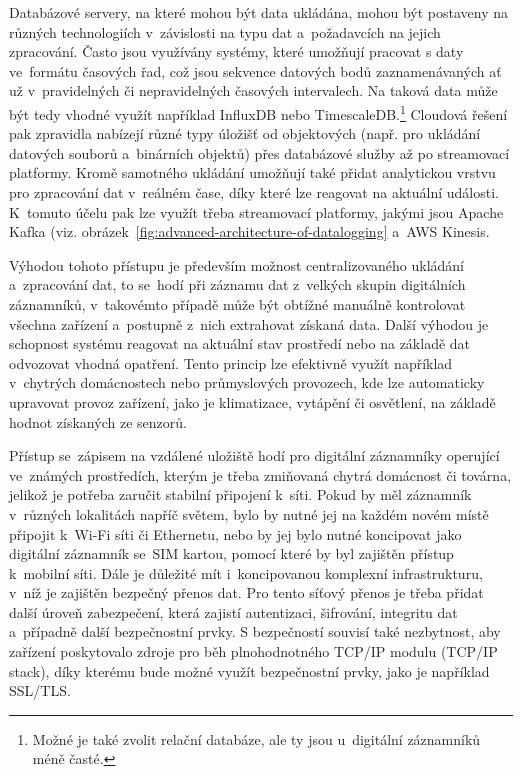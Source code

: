 Databázové servery, na které mohou být data ukládána, mohou být postaveny na různých technologiích v~závislosti na typu dat a~požadavcích na jejich zpracování. Často jsou využívány systémy, které umožňují pracovat s daty ve~formátu časových řad, což jsou sekvence datových bodů zaznamenávaných ať už v~pravidelných či nepravidelných časových intervalech. Na taková data může být tedy vhodné využít například InfluxDB nebo TimescaleDB.\footnote{Možné je také zvolit relační databáze, ale ty jsou u~digitální záznamníků méně časté.} Cloudová řešení pak zpravidla nabízejí různé typy úložišť od objektových (např. pro ukládání datových souborů a~binárních objektů) přes databázové služby až po streamovací platformy. Kromě samotného ukládání umožňují také přidat analytickou vrstvu pro zpracování dat v~reálném čase, díky které lze reagovat na aktuální události. K~tomuto účelu pak lze využít třeba streamovací platformy, jakými jsou Apache Kafka (viz. obrázek~\ref{fig:advanced-architecture-of-datalogging} a~AWS Kinesis.~\cite{springer_analysis_time_series_db_edge_computing}

Výhodou tohoto přístupu je především možnost centralizovaného ukládání a~zpracování dat, to se~hodí při záznamu dat z~velkých skupin digitálních záznamníků, v~takovémto případě může být obtížné manuálně kontrolovat všechna zařízení a~postupně z~nich extrahovat získaná data. Další výhodou je schopnost systému reagovat na aktuální stav prostředí nebo na základě dat odvozovat vhodná opatření. Tento princip lze efektivně využít například v~chytrých domácnostech nebo průmyslových provozech, kde lze automaticky upravovat provoz zařízení, jako je klimatizace, vytápění či osvětlení, na základě hodnot získaných ze senzorů.~\cite{springer_analysis_time_series_db_edge_computing, iot_datalogger_with_timestamping, researchgate_general_dataloggger_multiple_sdcards}

Přístup se~zápisem na vzdálené uložiště hodí pro digitální záznamníky operující ve~známých prostředích, kterým je třeba zmiňovaná chytrá domácnost či továrna, jelikož je potřeba zaručit stabilní připojení k~síti. Pokud by měl záznamník v~různých lokalitách napříč světem, bylo by nutné jej na každém novém místě připojit k~Wi-Fi síti či Ethernetu, nebo by jej bylo nutné koncipovat jako digitální záznamník se~SIM kartou, pomocí které by byl zajištěn přístup k~mobilní síti. Dále je důležité mít i~koncipovanou komplexní infrastrukturu, v~níž je zajištěn bezpečný přenos dat. Pro tento síťový přenos je třeba přidat další úroveň zabezpečení, která zajistí autentizaci, šifrování, integritu dat a~případně další bezpečnostní prvky. S bezpečností souvisí také nezbytnost, aby zařízení poskytovalo zdroje pro běh plnohodnotného TCP/IP modulu (TCP/IP stack), díky kterému bude možné využít bezpečnostní prvky, jako je například SSL/TLS.~\cite{springer_analysis_time_series_db_edge_computing, iot_datalogger_with_timestamping, researchgate_general_dataloggger_multiple_sdcards, iot_threats}


